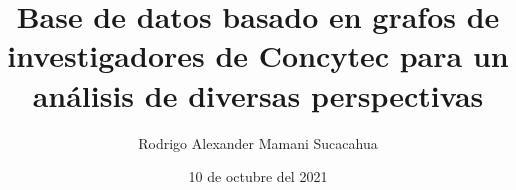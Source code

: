 \documentclass[5pt,openright,final]{unsa}
\title{Base de datos basado en grafos de investigadores de Concytec para un análisis de diversas perspectivas}
\author{Rodrigo Alexander Mamani Sucacahua}%
\date{10 de octubre del 2021}
\begin{document}
\providecommand{\keywords}[1]
{
  \small	
  \textbf{\textit{Keywords---}} #1
}
    \makeSecondCover %
\begin{frontmatter}


\end{frontmatter}%
\pagestyle{fancyplain}







\printglossaries
\begin{singlespace}
\end{singlespace}
\end{document}
